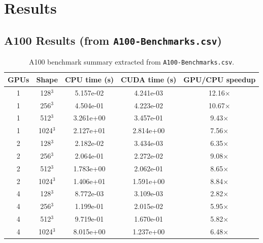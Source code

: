 \documentclass[11pt]{article}
\begin{document}
\section{Results}


\subsection{A100 Results (from \texttt{A100-Benchmarks.csv})}
\begin{table}[H]
\centering
\scriptsize
\begin{tabular}{ccccc}
\toprule
GPUs & Shape & CPU time (s) & CUDA time (s) & GPU/CPU speedup \\
\midrule
1 & 128$^3$  & 5.157e-02 & 4.241e-03 & 12.16$\times$ \\
1 & 256$^3$  & 4.504e-01 & 4.223e-02 & 10.67$\times$ \\
1 & 512$^3$  & 3.261e+00 & 3.457e-01 & 9.43$\times$ \\
1 & 1024$^3$ & 2.127e+01 & 2.814e+00 & 7.56$\times$ \\
2 & 128$^3$  & 2.182e-02 & 3.434e-03 & 6.35$\times$ \\
2 & 256$^3$  & 2.064e-01 & 2.272e-02 & 9.08$\times$ \\
2 & 512$^3$  & 1.783e+00 & 2.062e-01 & 8.65$\times$ \\
2 & 1024$^3$ & 1.406e+01 & 1.591e+00 & 8.84$\times$ \\
4 & 128$^3$  & 8.772e-03 & 3.109e-03 & 2.82$\times$ \\
4 & 256$^3$  & 1.199e-01 & 2.015e-02 & 5.95$\times$ \\
4 & 512$^3$  & 9.719e-01 & 1.670e-01 & 5.82$\times$ \\
4 & 1024$^3$ & 8.015e+00 & 1.237e+00 & 6.48$\times$ \\
\bottomrule
\end{tabular}
\caption{A100 benchmark summary extracted from \texttt{A100-Benchmarks.csv}.}
\end{table}
\end{document}
